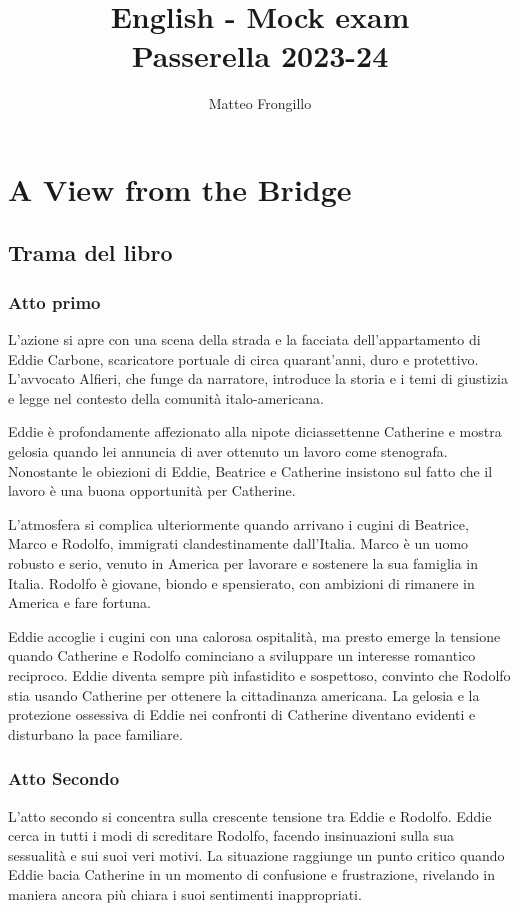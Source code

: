 \documentclass{article}
\title{English - Mock exam\\Passerella 2023-24}
\author{Matteo Frongillo}
\begin{document}
\maketitle
\tableofcontents
\pagebreak

\section{A View from the Bridge}

\subsection{Trama del libro}

\subsubsection{Atto primo}
L'azione si apre con una scena della strada e la facciata dell'appartamento di
Eddie Carbone, scaricatore portuale di circa quarant'anni, duro e protettivo.
L'avvocato Alfieri, che funge da narratore, introduce la storia e i temi di
giustizia e legge nel contesto della comunità italo-americana.

Eddie è profondamente affezionato alla nipote diciassettenne Catherine e mostra
gelosia quando lei annuncia di aver ottenuto un lavoro come stenografa.
Nonostante le obiezioni di Eddie, Beatrice e Catherine insistono sul fatto che
il lavoro è una buona opportunità per Catherine.

L'atmosfera si complica ulteriormente quando arrivano i cugini di Beatrice,
Marco e Rodolfo, immigrati clandestinamente dall'Italia. Marco è un uomo robusto
e serio, venuto in America per lavorare e sostenere la sua famiglia in Italia.
Rodolfo è giovane, biondo e spensierato, con ambizioni di rimanere in America e
fare fortuna.

Eddie accoglie i cugini con una calorosa ospitalità, ma presto emerge la
tensione quando Catherine e Rodolfo cominciano a sviluppare un interesse
romantico reciproco. Eddie diventa sempre più infastidito e sospettoso,
convinto che Rodolfo stia usando Catherine per ottenere la cittadinanza
americana. La gelosia e la protezione ossessiva di Eddie nei confronti di
Catherine diventano evidenti e disturbano la pace familiare.

\subsubsection{Atto Secondo}
L'atto secondo si concentra sulla crescente tensione tra Eddie e Rodolfo. Eddie
cerca in tutti i modi di screditare Rodolfo, facendo insinuazioni sulla sua 
sessualità e sui suoi veri motivi. La situazione raggiunge un punto critico
quando Eddie bacia Catherine in un momento di confusione e frustrazione,
rivelando in maniera ancora più chiara i suoi sentimenti inappropriati.
\end{document}
